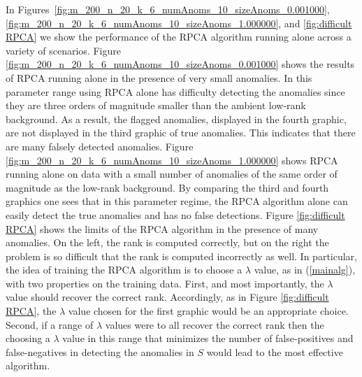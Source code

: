 \documentclass[conference]{IEEEtran}
\begin{document}
In Figures~\ref{fig:m_200_n_20_k_6_numAnoms_10_sizeAnoms_0.001000}, \ref{fig:m_200_n_20_k_6_numAnoms_10_sizeAnoms_1.000000}, and
\ref{fig:difficult RPCA} we show the performance of the RPCA algorithm running alone across a variety of scenarios. 
Figure \ref{fig:m_200_n_20_k_6_numAnoms_10_sizeAnoms_0.001000} shows the results of RPCA running alone in the presence of very small anomalies.   In this parameter range using RPCA alone has difficulty detecting the anomalies since they are three orders of magnitude smaller than the ambient low-rank background.  As a result, the flagged anomalies, displayed in the fourth graphic, are not displayed in the third graphic of true anomalies. This indicates that there are many falsely detected anomalies.
Figure \ref{fig:m_200_n_20_k_6_numAnoms_10_sizeAnoms_1.000000} shows RPCA running alone on data with a small number of anomalies of the same order of magnitude as the low-rank background.  By comparing the third and fourth graphics one sees that in this parameter regime, the RPCA algorithm alone can easily detect the true anomalies and has no false detections.  
Figure \ref{fig:difficult RPCA} shows the limits of the RPCA algorithm in the presence of many anomalies.   On the left, the rank is computed correctly, but on the right the problem is so difficult that the rank is computed incorrectly as well.
In particular, the idea of training the RPCA algorithm is to choose a $\lambda$ value, as in (\ref{mainalg}), with two properties on the training data.  First, and most importantly, the $\lambda$ value should recover the correct rank.  Accordingly, as in Figure \ref{fig:difficult RPCA}, the $\lambda$ value chosen for the first graphic would be an appropriate choice.  Second, if a range of $\lambda$ values were to all recover the correct rank then the choosing a $\lambda$ value in this range that minimizes the number of false-positives and false-negatives in detecting the anomalies in $S$ would lead to the most effective algorithm.
 
\end{document}
